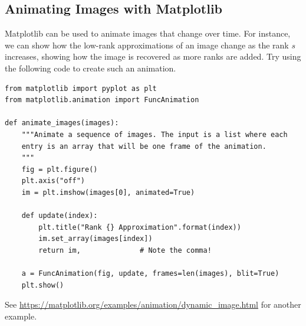 \subsection*{Animating Images with Matplotlib} %

Matplotlib can be used to animate images that change over time.
For instance, we can show how the low-rank approximations of an image change as the rank $s$ increases, showing how the image is recovered as more ranks are added.
Try using the following code to create such an animation.

\begin{lstlisting}
from matplotlib import pyplot as plt
from matplotlib.animation import FuncAnimation

def animate_images(images):
    """Animate a sequence of images. The input is a list where each
    entry is an array that will be one frame of the animation.
    """
    fig = plt.figure()
    plt.axis("off")
    im = plt.imshow(images[0], animated=True)

    def update(index):
        plt.title("Rank {} Approximation".format(index))
        im.set_array(images[index])
        return im,              # Note the comma!

    a = FuncAnimation(fig, update, frames=len(images), blit=True)
    plt.show()
\end{lstlisting}
See \url{https://matplotlib.org/examples/animation/dynamic_image.html} for another example.
